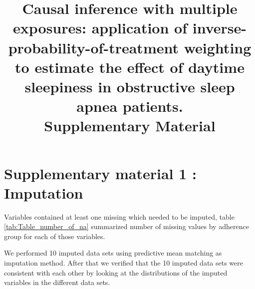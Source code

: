 \documentclass{article}
\title{Causal inference with multiple exposures: application of inverse-probability-of-treatment weighting to estimate the effect of daytime sleepiness in obstructive sleep apnea patients. \\
  Supplementary Material}
\author{}
\date{}
\begin{document}
\maketitle





\clearpage
\section*{Supplementary material 1 : Imputation}
Variables contained at least one missing which needed to be imputed, table \ref{tab:Table_number_of_na} summarized number of missing values by adherence group for each of those variables.

We performed 10 imputed data sets using predictive mean matching as imputation method. After that we verified that the 10 imputed data sets were consistent with each other by looking at the distributions of the imputed variables in the different data sets.
\end{document}
